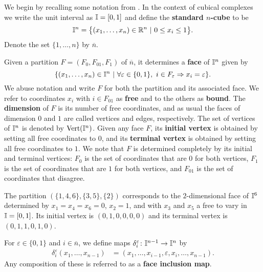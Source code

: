 We begin by recalling some notation from \cite{FMS-flows}.
In the context of cubical complexes we write the unit interval as $\mathbb{I} = [0,1]$ and define the \textbf{standard $n$-cube} to be
\begin{equation*}
	\mathbb{I}^n = \big\{ (x_1, \dots, x_n) \in \mathbb{R}^n\ |\ 0 \leq x_i \leq 1 \big\}.
\end{equation*}
Denote the set $\{1, \dots, n\}$ by $\overline{n}$.

Given a partition $F = (F_0, F_{01}, F_1)$ of $\overline n$, it determines a \textbf{face} of $\mathbb{I}^n$ given by
\begin{equation*}
	\{(x_1, \dots, x_n) \in \mathbb{I}^n\ |\ \forall \varepsilon \in \{0, 1\},\ i \in F_\varepsilon \Rightarrow x_i = \varepsilon\}.
\end{equation*}
We abuse notation and write $F$ for both the partition and its associated face.
We refer to coordinates $x_i$ with $i \in F_{01}$ as \textbf{free} and to the others as \textbf{bound}.
The \textbf{dimension} of $F$ is its number of free coordinates, and as usual the faces of dimension $0$ and $1$ are called vertices and edges, respectively.
The set of vertices of $\mathbb{I}^n$ is denoted by ${\rm Vert}(\mathbb{I}^n)$.
Given any face $F$, its \textbf{initial vertex} is obtained by setting all free coordinates to $0$, and its \textbf{terminal vertex} is obtained by setting all free coordinates to $1$.
We note that $F$ is determined completely by its initial and terminal vertices: $F_0$ is the set of coordinates that are $0$ for both vertices, $F_1$ is the set of coordinates that are $1$ for both vertices, and $F_{01}$ is the set of coordinates that disagree.

\begin{example}
	The partition $(\{1,4,6\},\{3,5\}, \{2\})$ corresponds to the $2$-dimensional face of $\mathbb{I}^6$ determined by $x_1=x_4=x_6=0$, $x_2=1$, and with $x_3$ and $x_5$ a free to vary in $\mathbb{I} = [0,1]$.
	Its initial vertex is $(0,1,0,0,0,0)$ and its terminal vertex is $(0,1,1,0,1,0)$.
\end{example}

For $\varepsilon \in \{0, 1\}$ and $i \in \overline{n}$, we define maps $\delta_i^\varepsilon \colon \mathbb{I}^{n-1} \to \mathbb{I}^{n}$ by
\begin{align*}
	\delta_i^\varepsilon(x_1, \dots, x_{n-1}) & = (x_1, \dots, x_{i-1}, \varepsilon, x_i, \dots, x_{n-1}).
\end{align*}
Any composition of these is referred to as a \textbf{face inclusion map}.

